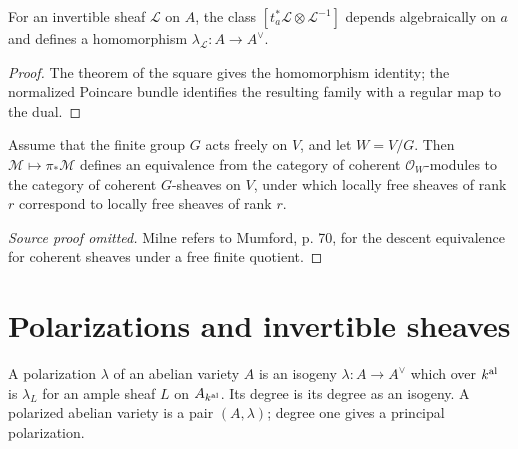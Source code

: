 \begin{lemma}
\label{lem:milne-8-8}

For an invertible sheaf $\mathcal L$ on $A$, the class
$[t_a^*\mathcal L\otimes\mathcal L^{-1}]$ depends algebraically on $a$
and defines a homomorphism $\lambda_{\mathcal L}:A\to A^\vee$.
\end{lemma}

\begin{proof}

The theorem of the square gives the homomorphism identity; the normalized
Poincare bundle identifies the resulting family with a regular map to the dual.

\end{proof}

\begin{proposition}
\label{prop:milne-8-13}

Assume that the finite group $G$ acts freely on $V$, and let $W=V/G$.  Then
$\mathcal M\mapsto\pi_*\mathcal M$ defines an equivalence from the category
of coherent $\mathcal O_W$-modules to the category of coherent $G$-sheaves on
$V$, under which locally free sheaves of rank $r$ correspond to locally free
sheaves of rank $r$.
\end{proposition}

\begin{proof}[Source proof omitted]
Milne refers to Mumford, p. 70, for the descent equivalence for coherent
sheaves under a free finite quotient.
\end{proof}


\section{Polarizations and invertible sheaves}
\begin{definition}[Polarization]\label{def:milne-polarization}
A polarization $\lambda$ of an abelian variety $A$ is an isogeny $\lambda:A\to A^\vee$ which over $k^{\rm al}$ is $\lambda_L$ for an ample sheaf $L$ on $A_{k^{\rm al}}$. Its degree is its degree as an isogeny. A polarized abelian variety is a pair $(A,\lambda)$; degree one gives a principal polarization.
\end{definition}

